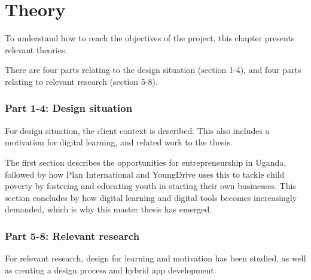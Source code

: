 %

\section{Theory}

To understand how to reach the objectives of the project, this chapter presents relevant theories.

There are four parts relating to the design situation (section 1-4), and four parts relating to relevant research (section 5-8).

\subsubsection{Part 1-4: Design situation}
For design situation, the client context is described. This also includes a motivation for digital learning, and related work to the thesis.

The first section describes the opportunities for entrepreneurship in Uganda, followed by how Plan International and YoungDrive uses this to tackle child poverty by fostering and educating youth in starting their own businesses. This section concludes by how digital learning and digital tools becomes increasingly demanded, which is why this master thesis has emerged.

\subsubsection{Part 5-8: Relevant research}
For relevant research, design for learning and motivation has been studied, as well as creating a design process and hybrid app development.










